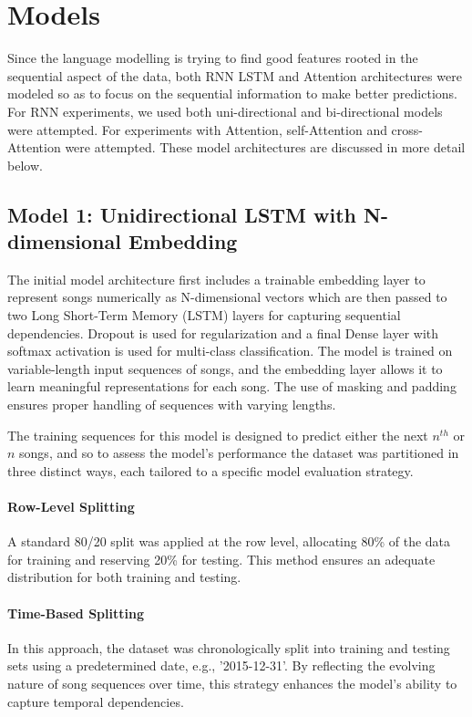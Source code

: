 \documentclass{article}
\begin{document}
\section{Models}

Since the language modelling is trying to find good features rooted in the sequential aspect of the data, both RNN LSTM and Attention architectures were modeled so as to focus on the sequential information to make better predictions. For RNN experiments, we used both uni-directional and bi-directional models were attempted. For experiments with Attention, self-Attention and cross-Attention were attempted. These model architectures are discussed in more detail below. 

\subsection{Model 1: Unidirectional LSTM with N-dimensional Embedding}

The initial model architecture first includes a trainable embedding layer to represent songs numerically as N-dimensional vectors which are then passed to two Long Short-Term Memory (LSTM) layers for capturing sequential dependencies. Dropout is used for regularization and a final Dense layer with softmax activation is used for multi-class classification. The model is trained on variable-length input sequences of songs, and the embedding layer allows it to learn meaningful representations for each song. The use of masking and padding ensures proper handling of sequences with varying lengths. 

The training sequences for this model is designed to predict either the next $n^{th}$ or $n$ songs, and so to assess the model's performance the dataset was partitioned in three distinct ways, each tailored to a specific model evaluation strategy.

\paragraph{Row-Level Splitting}
A standard 80/20 split was applied at the row level, allocating 80\% of the data for training and reserving 20\% for testing. This method ensures an adequate distribution for both training and testing. 

\paragraph{Time-Based Splitting}
In this approach, the dataset was chronologically split into training and testing sets using a predetermined date, e.g., '2015-12-31'. By reflecting the evolving nature of song sequences over time, this strategy enhances the model's ability to capture temporal dependencies. 
\end{document}
